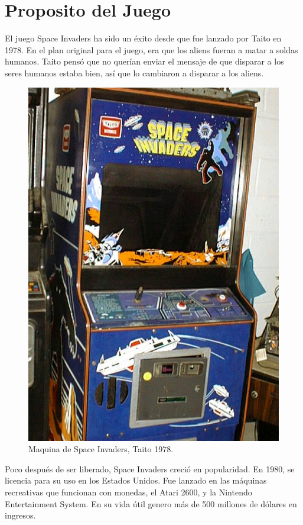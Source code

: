 \documentclass[a4paper]{article}
\begin{document}
\section{Proposito del Juego}
El juego Space Invaders ha sido un éxito desde que fue lanzado por Taito en 1978. En el plan original para el juego, era que los aliens fueran a matar a soldas humanos. Taito pensó que no querían enviar el mensaje de que disparar a los  seres humanos  estaba bien, así que lo cambiaron a disparar a los aliens.\\
\begin{figure}
  \centering
    \includegraphics[scale=0.5]{images/machine}
  \caption{Maquina de Space Invaders, Taito 1978.}
  \label{fig:ejemplo}
\end{figure}
Poco después de ser liberado, Space Invaders creció en popularidad. En 1980, se licencia para su uso en los Estados Unidos. Fue lanzado en las máquinas recreativas que funcionan con monedas, el Atari 2600, y la Nintendo Entertainment System. En su vida útil genero más de 500 millones de dólares en ingresos.\\
\end{document}
